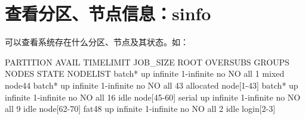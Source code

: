 
\section{查看分区、节点信息：sinfo}
可以查看系统存在什么分区、节点及其状态。如：
\begin{OUT}
PARTITION AVAIL  TIMELIMIT   JOB_SIZE ROOT OVERSUBS     GROUPS  NODES       STATE NODELIST
batch*       up   infinite 1-infinite   no       NO        all      1       mixed node44
batch*       up   infinite 1-infinite   no       NO        all     43   allocated node[1-43]
batch*       up   infinite 1-infinite   no       NO        all     16        idle node[45-60]
serial       up   infinite 1-infinite   no       NO        all      9        idle node[62-70]
fat48        up   infinite 1-infinite   no       NO        all      2        idle login[2-3]
\end{OUT}

